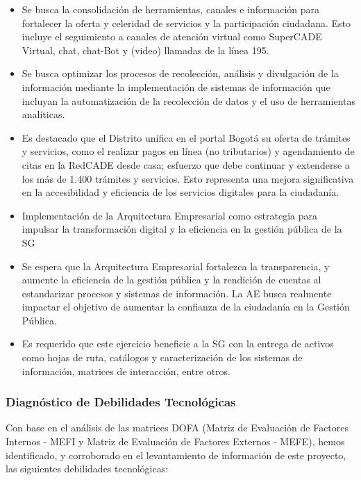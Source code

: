 \documentclass[
	a4paper, %
	12pt, %
]{include/CSSullivanBusinessReport}
\def\tightlist{}
\begin{document}
\begin{itemize}
  \begin{itemize}
  \tightlist
  \item
    Se busca la consolidación de herramientas, canales e información
    para fortalecer la oferta y celeridad de servicios y la
    participación ciudadana. Esto incluye el seguimiento a canales de
    atención virtual como SuperCADE Virtual, chat, chat-Bot y (video)
    llamadas de la línea 195.
  \item
    Se busca optimizar los procesos de recolección, análisis y
    divulgación de la información mediante la implementación de sistemas
    de información que incluyan la automatización de la recolección de
    datos y el uso de herramientas analíticas.
  \item
    Es destacado que el Distrito unifica en el portal Bogotá su oferta
    de trámites y servicios, como el realizar pagos en línea (no
    tributarios) y agendamiento de citas en la RedCADE desde casa;
    esfuerzo que debe continuar y extenderse a los más de 1.400 trámites
    y servicios. Esto representa una mejora significativa en la
    accesibilidad y eficiencia de los servicios digitales para la
    ciudadanía.
  \item
    Implementación de la Arquitectura Empresarial como estrategia para
    impulsar la transformación digital y la eficiencia en la gestión
    pública de la SG
  \item
    Se espera que la Arquitectura Empresarial fortalezca la
    transparencia, y aumente la eficiencia de la gestión pública y la
    rendición de cuentas al estandarizar procesos y sistemas de
    información. La AE busca realmente impactar el objetivo de aumentar
    la confianza de la ciudadanía en la Gestión Pública.
  \item
    Es requerido que este ejercicio beneficie a la SG con la entrega de
    activos como hojas de ruta, catálogos y caracterización de los
    sistemas de información, matrices de interacción, entre otros.
  \end{itemize}
\end{itemize}

\subsubsection{Diagnóstico de Debilidades
Tecnológicas}\label{sec:diagnuxf3stico-de-debilidades-tecnoluxf3gicas}

Con base en el análisis de las matrices DOFA (Matriz de Evaluación de
Factores Internos - MEFI y Matriz de Evaluación de Factores Externos -
MEFE), hemos identificado, y corroborado en el levantamiento de
información de este proyecto, las siguientes debilidades tecnológicas:
\end{document}
